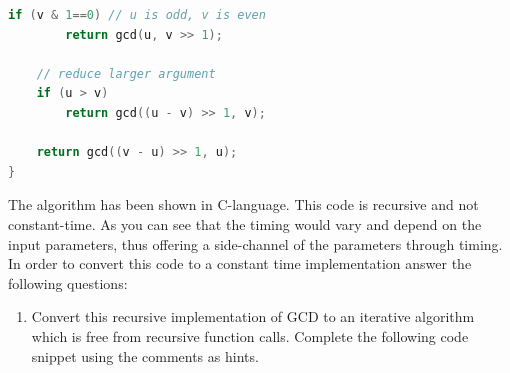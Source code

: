 \documentclass{article}
\begin{document}
\begin{questions}
\begin{lstlisting}[language=C]
    if (v & 1==0) // u is odd, v is even
        return gcd(u, v >> 1);

    // reduce larger argument
    if (u > v)
        return gcd((u - v) >> 1, v);

    return gcd((v - u) >> 1, u);
}
\end{lstlisting}


The algorithm has been shown in C-language. This code is 
recursive and not constant-time. As you can 
see that the timing would vary and depend on the 
input parameters, thus offering a side-channel 
of the parameters through timing. In order to convert this code 
to a constant time implementation answer the 
following questions:

\begin{enumerate}
\item Convert this recursive implementation of GCD to an iterative algorithm which is free from recursive function calls. Complete the 
following code snippet using the comments as hints.



 
 
 

       



\end{enumerate}
\end{questions}
\end{document}
